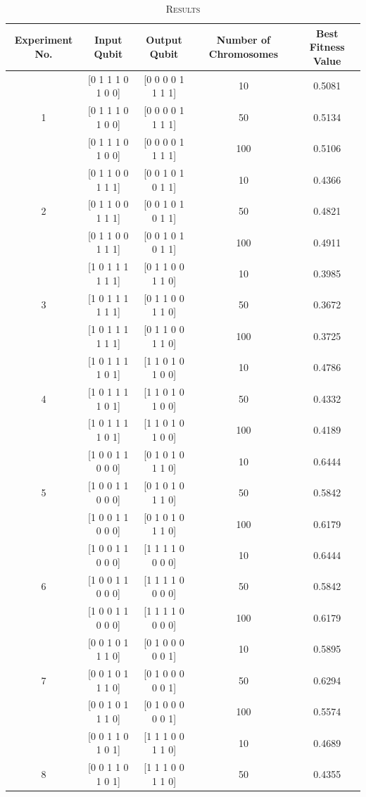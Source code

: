\documentclass[conference]{IEEEtran}
\begin{document}
\begin{table}[!t]
\caption{\textsc{Results}}
\label{tab:1}
\centering
{
\begin{tabular}{| c | c | c | c | c |}
\hline
Experiment No. & Input Qubit & Output Qubit & Number of Chromosomes &  Best Fitness Value \\
\hline
 & [0 1 1 1 0 1 0 0] & [0 0 0 0 1 1 1 1] & 10 & 0.5081 \\
1 & [0 1 1 1 0 1 0 0] & [0 0 0 0 1 1 1 1] & 50 & 0.5134 \\
 & [0 1 1 1 0 1 0 0] & [0 0 0 0 1 1 1 1] & 100 & 0.5106 \\
\hline
 & [0 1 1 0 0 1 1 1] & [0 0 1 0 1 0 1 1] & 10 & 0.4366 \\
2 & [0 1 1 0 0 1 1 1] & [0 0 1 0 1 0 1 1] & 50 & 0.4821 \\
 & [0 1 1 0 0 1 1 1] & [0 0 1 0 1 0 1 1] & 100 & 0.4911 \\
\hline
 & [1 0 1 1 1 1 1 1] & [0 1 1 0 0 1 1 0] & 10 & 0.3985 \\
3 & [1 0 1 1 1 1 1 1] & [0 1 1 0 0 1 1 0] & 50 & 0.3672 \\
 & [1 0 1 1 1 1 1 1] & [0 1 1 0 0 1 1 0] & 100 & 0.3725 \\
\hline
 & [1 0 1 1 1 1 0 1] & [1 1 0 1 0 1 0 0] & 10 & 0.4786 \\
4 & [1 0 1 1 1 1 0 1] & [1 1 0 1 0 1 0 0] & 50 & 0.4332 \\
 & [1 0 1 1 1 1 0 1] & [1 1 0 1 0 1 0 0] & 100 & 0.4189 \\
\hline
 & [1 0 0 1 1 0 0 0] & [0 1 0 1 0 1 1 0] & 10 & 0.6444 \\
5 & [1 0 0 1 1 0 0 0] & [0 1 0 1 0 1 1 0] & 50 & 0.5842 \\
 & [1 0 0 1 1 0 0 0] & [0 1 0 1 0 1 1 0] & 100 & 0.6179 \\
\hline
 & [1 0 0 1 1 0 0 0] & [1 1 1 1 0 0 0 0] & 10 & 0.6444 \\
6 & [1 0 0 1 1 0 0 0] & [1 1 1 1 0 0 0 0] & 50 & 0.5842 \\
 & [1 0 0 1 1 0 0 0] & [1 1 1 1 0 0 0 0] & 100 & 0.6179 \\
\hline
 & [0 0 1 0 1 1 1 0] & [0 1 0 0 0 0 0 1] & 10 & 0.5895 \\
7 & [0 0 1 0 1 1 1 0] & [0 1 0 0 0 0 0 1] & 50 & 0.6294 \\
 & [0 0 1 0 1 1 1 0] & [0 1 0 0 0 0 0 1] & 100 & 0.5574 \\
\hline
 & [0 0 1 1 0 1 0 1] & [1 1 1 0 0 1 1 0] & 10 & 0.4689 \\
8 & [0 0 1 1 0 1 0 1] & [1 1 1 0 0 1 1 0] & 50 & 0.4355 \\

\end{tabular}}
\end{table}
\end{document}
